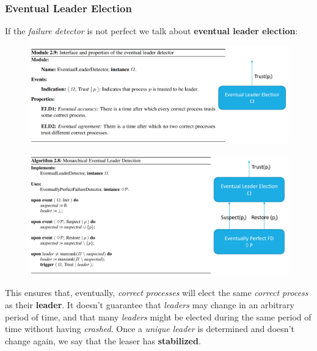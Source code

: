 \documentclass{article}
\begin{document}
\subsubsection{Eventual Leader Election}
If the \emph{failure detector} is not perfect we talk about \textbf{eventual leader election}:
\begin{figure}[H]
  \centering
  \includegraphics[scale=0.6, left]{cattura22.png}
\end{figure}
\begin{figure}[H]
  \centering
  \includegraphics[scale=0.7, left]{cattura23.png}
\end{figure}
This ensures that, eventually, \emph{correct processes} will elect the same \emph{correct process} as their \textbf{leader}. It doesn't guarantee that \emph{leaders} may change in an arbitrary period of time, and that many \emph{leaders} might be elected during the same period of time without having \emph{crashed}. Once a \emph{unique leader} is determined and doesn't change again, we say that the leaser has \textbf{stabilized}. 
\end{document}
